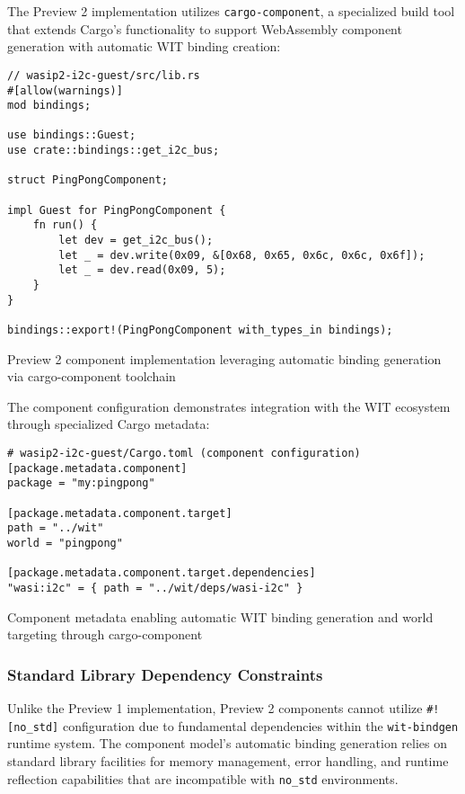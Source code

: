 The Preview 2 implementation utilizes \texttt{cargo-component}, a specialized build tool that extends Cargo's functionality to support WebAssembly component generation with automatic WIT binding creation:

\begin{listing}[H]
\begin{verbatim}
// wasip2-i2c-guest/src/lib.rs
#[allow(warnings)]
mod bindings;

use bindings::Guest;
use crate::bindings::get_i2c_bus;

struct PingPongComponent;

impl Guest for PingPongComponent {
    fn run() {
        let dev = get_i2c_bus();
        let _ = dev.write(0x09, &[0x68, 0x65, 0x6c, 0x6c, 0x6f]);
        let _ = dev.read(0x09, 5);
    }
}

bindings::export!(PingPongComponent with_types_in bindings);
\end{verbatim}
\caption{Preview 2 component implementation leveraging automatic binding generation via cargo-component toolchain}
\label{lst:preview2-guest}
\end{listing}

The component configuration demonstrates integration with the WIT ecosystem through specialized Cargo metadata:

\begin{listing}[H]
\begin{verbatim}
# wasip2-i2c-guest/Cargo.toml (component configuration)
[package.metadata.component]
package = "my:pingpong"

[package.metadata.component.target]
path = "../wit"
world = "pingpong"

[package.metadata.component.target.dependencies]
"wasi:i2c" = { path = "../wit/deps/wasi-i2c" }
\end{verbatim}
\caption{Component metadata enabling automatic WIT binding generation and world targeting through cargo-component}
\label{lst:component-config}
\end{listing}

\subsubsection{Standard Library Dependency Constraints}

Unlike the Preview 1 implementation, Preview 2 components cannot utilize \texttt{\#![no\_std]} configuration due to fundamental dependencies within the \texttt{wit-bindgen} runtime system. The component model's automatic binding generation relies on standard library facilities for memory management, error handling, and runtime reflection capabilities that are incompatible with \texttt{no\_std} environments.

